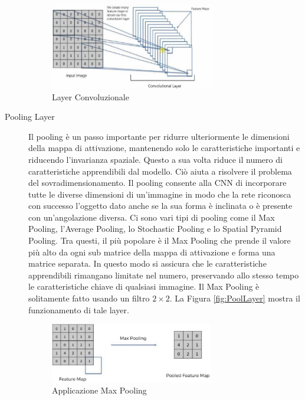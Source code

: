 \begin{description}
    \begin{figure}[h]
        \centering
        \includegraphics[width=0.7\textwidth]{images/CNN/ConvsLayer.png}
        \caption{Layer Convoluzionale \cite{9077735}}
        \label{fig:ConvLayer}
    \end{figure}
    \item[Pooling Layer] Il pooling è un passo importante per ridurre ulteriormente le dimensioni della mappa di
    attivazione, mantenendo solo le caratteristiche importanti e riducendo l'invarianza spaziale. Questo a sua 
    volta riduce il numero di caratteristiche apprendibili dal modello. Ciò aiuta a risolvere il problema del
    sovradimensionamento. Il pooling consente alla CNN di incorporare tutte le diverse dimensioni di un'immagine 
    in modo che la rete riconosca con successo l'oggetto dato anche se la sua forma è inclinata o è presente con
    un'angolazione diversa. 
    Ci sono vari tipi di pooling come il Max Pooling, l'Average Pooling, lo Stochastic Pooling e lo Spatial Pyramid
    Pooling. Tra questi, il più popolare è il Max Pooling che prende il valore più alto da ogni sub matrice della mappa 
    di attivazione e forma una matrice separata. In questo modo si assicura che le caratteristiche apprendibili
    rimangano limitate nel numero, preservando allo stesso tempo le caratteristiche chiave di qualsiasi immagine. 
    Il Max Pooling è solitamente fatto usando un filtro $2 \times 2$. La Figura \ref{fig:PoolLayer} mostra il
    funzionamento di tale layer.  
    \begin{figure}[h!]
        \centering
        \includegraphics[width=0.7\textwidth]{images/PoolLayer.png}
        \caption{Applicazione Max Pooling \cite{9077735}}

\end{figure}
\end{description}
